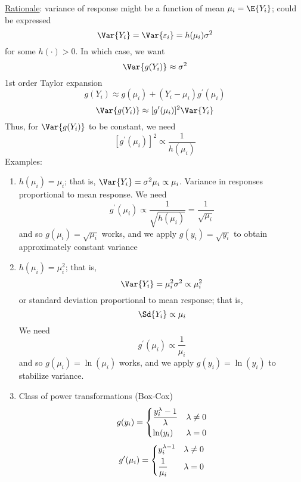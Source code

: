 \begin{enumerate}[label=(\arabic*)]
            \underline{Rationale}: variance of response might be a function
            of mean $ \mu_i=\E{Y_i} $; could be expressed
            \[ \Var{Y_i}=\Var{\varepsilon_i}=h(\mu_i)\sigma^2 \]
            for some $ h(\cdot)>0 $. In which case, we want
            \[ \Var{g(Y_i)}\approx \sigma^2 \]
            1st order Taylor expansion
            \[ g(Y_i)\approx g(\mu_i)+(Y_i-\mu_i)g^\prime(\mu_i) \]
            \[ \Var{g(Y_i)}\approx [g^\prime(\mu_i)]^2\Var{Y_i} \]
            Thus, for $ \Var{g(Y_i)} $ to be constant, we need
            \[ [g^\prime(\mu_i)]^2\propto \frac{1}{h(\mu_i)} \]
            Examples:
            \begin{enumerate}[label=(\roman*)]
                  \item $ h(\mu_i)=\mu_i $; that is,
                        $ \Var{Y_i}=\sigma^2 \mu_i\propto \mu_i $.
                        Variance in responses proportional to mean response.
                        We need
                        \[ g^\prime(\mu_i)\propto \frac{1}{\sqrt{h(\mu_i)}}=
                              \frac{1}{\sqrt{\mu_i}} \]
                        and so $ g(\mu_i)=\sqrt{\mu_i} $ works,
                        and we apply $ g(y_i)=\sqrt{y_i} $
                        to obtain approximately constant variance
                  \item $ h(\mu_i)=\mu_i^2 $; that is,
                        \[ \Var{Y_i}=\mu_i^2 \sigma^2\propto \mu_i^2 \]
                        or standard deviation proportional to mean response;
                        that is,
                        \[ \Sd{Y_i}\propto \mu_i \]
                        We need
                        \[ g^\prime(\mu_i)\propto\frac{1}{\mu_i} \]
                        and so $ g(\mu_i)=\ln(\mu_i) $ works, and we apply
                        $ g(y_i)=\ln(y_i) $
                        to stabilize variance.
                  \item Class of power transformations (Box-Cox)
                        \[ g(y_i)=\begin{dcases}
                                    \frac{y_i^\lambda -1}{\lambda} & \lambda\neq 0 \\
                                    \ln(y_i)                       & \lambda=0
                              \end{dcases} \]
                        \[ g^\prime(\mu_i)=\begin{dcases}
                                    y_i^{\lambda-1} & \lambda\neq 0 \\
                                    \frac{1}{\mu_i} & \lambda=0

\end{dcases}\]
\end{enumerate}
\end{enumerate}
